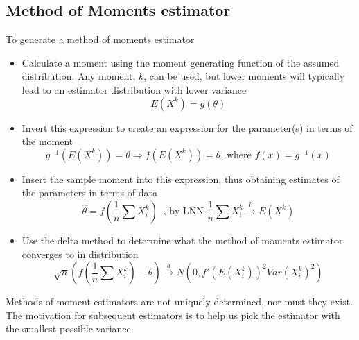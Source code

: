 \documentclass{article}
\begin{document}
\subsection{Method of Moments estimator}

To generate a method of moments estimator
\begin{itemize}
    \item Calculate a moment using the moment generating function of the assumed distribution. Any moment, $k$, can be used, but lower moments will typically lead to an estimator distribution with lower variance
    \begin{equation*}
        E(X^k) = g(\theta)
    \end{equation*}
    \item Invert this expression to create an expression for the parameter(s) in terms of the moment
    \begin{equation*}
        g^{-1}(E(X^k)) = \theta \Longrightarrow f(E(X^k)) = \theta \textrm{, where } f(x) = g^{-1}(x)
    \end{equation*}
    \item Insert the sample moment into this expression, thus obtaining estimates of the parameters in terms of data
    \begin{equation*}
        \hat{\theta} = f(\frac{1}{n}\sum X_i^k) \; \;\textrm{, by LNN } \frac{1}{n}\sum X_i^k \overset{p}{\longrightarrow} E(X^k)
    \end{equation*}
    \item Use the delta method to determine what the method of moments estimator converges to in distribution
    \begin{equation*}
        \sqrt{n}(f(\frac{1}{n}\sum X_i^k) - \theta) \overset{d}{\longrightarrow}  N(0, f'(E(X_i^k))^2Var(X_i^k)^2)
    \end{equation*}
\end{itemize}
Methods of moment estimators are not uniquely determined, nor must they exist. The motivation for subsequent estimators is to help us pick the estimator with the smallest possible variance.
\end{document}

